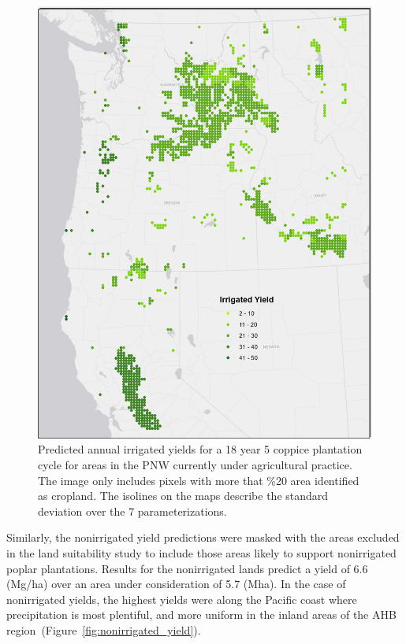 \documentclass[preprint,12pt]{elsarticle}
\begin{document}
\begin{figure}[hp]
  \centering
  \includegraphics[width=1.0\linewidth]{irrigated_yield}
  \caption{Predicted annual irrigated yields for a 18 year 5 coppice plantation cycle for areas in the \ac{PNW} currently under agricultural practice.  The image only includes pixels with more that \%20 area identified as cropland.  The isolines on the maps describe the standard deviation over the 7 parameterizations.}
  \label{fig:irrigated_yield}
\end{figure}

Similarly, the nonirrigated yield predictions were masked with the
areas excluded in the land suitability study to include those areas
likely to support nonirrigated poplar plantations.  Results for the
nonirrigated lands predict a yield of 6.6 (Mg/ha) over an area under
consideration of 5.7 (Mha).  In the case of nonirrigated yields, the
highest yields were along the Pacific coast where precipitation is
most plentiful, and more uniform in the inland areas of the \ac{AHB}
region~(Figure~\ref{fig:nonirrigated_yield}).
\end{document}
